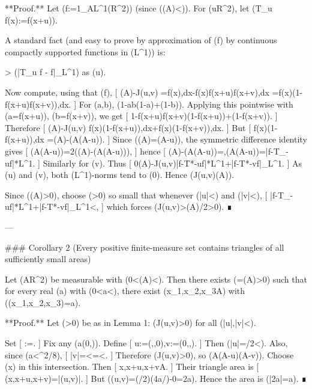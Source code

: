 **Proof.**
Let (f:=1_A\in L^1(\mathbb R^2)) (since (\mu(A)<\infty)). For (u\in\mathbb R^2), let (T_u f(x):=f(x+u)).

A standard fact (and easy to prove by approximation of (f) by continuous compactly supported functions in (L^1)) is:

> (|T_u f - f|_{L^1}) as (u).

Now compute, using that (f),
[
\mu(A)-J(u,v)
=\int f(x),dx-\int f(x)f(x+u)f(x+v),dx
=\int f(x)\bigl(1-f(x+u)f(x+v)\bigr),dx.
]
For (a,b\in[0,1]), (1-ab\le (1-a)+(1-b)). Applying this pointwise with (a=f(x+u)), (b=f(x+v)), we get
[
1-f(x+u)f(x+v)\le (1-f(x+u))+(1-f(x+v)).
]
Therefore
[
\mu(A)-J(u,v)
\le \int f(x)\bigl(1-f(x+u)\bigr),dx+\int f(x)\bigl(1-f(x+v)\bigr),dx.
]
But
[
\int f(x)\bigl(1-f(x+u)\bigr),dx
=\mu(A)-\mu\bigl(A\cap(A-u)\bigr).
]
Since (\mu(A)=\mu(A-u)), the symmetric difference identity gives
[
\mu(A\triangle(A-u))=2\bigl(\mu(A)-\mu(A\cap(A-u))\bigr),
]
hence
[
\mu(A)-\mu(A\cap(A-u))=,\mu(A\triangle(A-u))=|f-T_{-u}f|*{L^1}.
]
Similarly for (v). Thus
[
0\le \mu(A)-J(u,v)\le {}|f-T*{-u}f|*{L^1}+|f-T*{-v}f|_{L^1}.
]
As (u) and (v), both (L^1)-norms tend to (0). Hence (J(u,v)\to\mu(A)).

Since (\mu(A)>0), choose (\rho>0) so small that whenever (|u|<\rho) and (|v|<\rho),
[
|f-T_{-u}f|*{L^1}+|f-T*{-v}f|_{L^1}<,
]
which forces (J(u,v)>\mu(A)/2>0). ∎

---

### Corollary 2 (Every positive finite-measure set contains triangles of all sufficiently small areas)

Let (A\subset\mathbb R^2) be measurable with (0<\mu(A)<\infty). Then there exists (\varepsilon=\varepsilon(A)>0) such that for every real (a) with (0<a<\varepsilon), there exist (x_1,x_2,x_3\in A) with ((x_1,x_2,x_3)=a).

**Proof.**
Let (\rho>0) be as in Lemma 1: (J(u,v)>0) for all (|u|,|v|<\rho).

Set
[
\varepsilon:=.
]
Fix any (a\in(0,\varepsilon)). Define
[
u:=\left(,,0\right),\qquad v:=\left(0,,\right).
]
Then (|u|=\rho/2<\rho). Also, since (a<\rho^2/8),
[
|v|=<=<\rho.
]
Therefore (J(u,v)>0), so (A\cap(A-u)\cap(A-v)\neq\varnothing). Choose (x) in this intersection. Then
[
x,\quad x+u,\quad x+v\in A.
]
Their triangle area is
[
(x,x+u,x+v)=|\det(u,v)|.
]
But (\det(u,v)=(\rho/2)\cdot(4a/\rho)-0=2a). Hence the area is (|2a|=a). ∎

